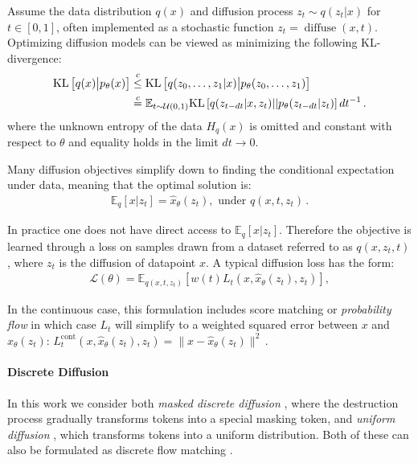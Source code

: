 Assume the data distribution $q(x)$ and diffusion process $z_t \sim q(z_t | x)$ for $t \in [0, 1]$, often implemented as a stochastic function $z_t = \operatorname{diffuse}(x, t)$. Optimizing diffusion models can be viewed as minimizing the following KL-divergence:
\begin{align}
\begin{split}
    \mathrm{KL} \left[ q(x) \big{|} p_\theta(x) \right] &\stackrel{c}{\leq} \mathrm{KL} \left[ q(z_0, \ldots, z_1 | x) \big{|} p_\theta(z_0, \ldots, z_1) \right] \\
    &\stackrel{c}{=} \mathbb{E}_{t \sim \mathcal{U}(0, 1)} \mathrm{KL} \left[q(z_{t-dt}|x, z_t) || p_\theta(z_{t-dt}|z_t) \right] dt^{-1}\,.
\end{split}
\label{eq:diffusion_elbo}
\end{align}
where the unknown entropy of the data $H_q(x)$ is omitted and constant with respect to $\theta$ and equality holds in the limit $dt \to 0$.

Many diffusion objectives simplify down to finding the conditional expectation under data, meaning that the optimal solution is:
\begin{align}
    \mathbb{E}_q[x|z_t] = \hat{x}_\theta(z_t), \text{ under } q(x, t, z_t) \,. \label{eq:diffusion_l_star}
\end{align}

In practice one does not have direct access to $\mathbb{E}_q[x|z_t]$. Therefore the objective is learned through a loss on samples drawn from a dataset referred to as $q(x, z_t, t)$, where $z_t$ is the diffusion of datapoint $x$.
A typical diffusion loss has the form:
\begin{align}
    \mathcal{L}(\theta) = \mathbb{E}_{q(x, t, z_t)}\left[w(t) L_t(x, \hat{x}_\theta(z_t), z_t)\right], \label{eq:diffusion_l}
\end{align}

In the continuous case, this formulation includes score matching \citep{song2021scorebasedsde} or \emph{probability flow} \citep{lipman2023flowmatching} in which case $L_t$ will simplify to a weighted squared error between $x$ and $\hat{x}_\theta(z_t)$: $L_t^{\mathrm{cont}}(x, \hat{x}_\theta(z_t), z_t) = \lVert x - \hat{x}_\theta(z_t) \rVert^2 \,.$
\paragraph{Discrete Diffusion}
In this work we consider both \emph{masked discrete diffusion} \citep{austin2021structured}, where the destruction process gradually transforms tokens into a special masking token, and  \emph{uniform diffusion} \citep{hoogeboom2021argmaxflows}, which transforms tokens into a uniform distribution.
Both of these can also be formulated as discrete flow matching \citep{gat2024discreteflowmatching}.



